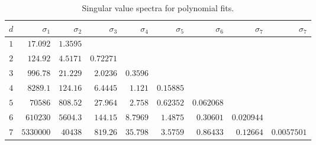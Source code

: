 {\small{
\begin{table}[t]
	\begin{center}
		\begin{tabular}{rrrrrrrrr}
 		  $d$ & $\sigma_{1}$ & $\sigma_{2}$ & $\sigma_{3}$ & $\sigma_{4}$ & 
		        $\sigma_{5}$ & $\sigma_{6}$ & $\sigma_{7}$ & $\sigma_{7}$ \\\hline
      $1$ & $17.092$ & $1.3595$ \\
      $2$ & $124.92$ & $4.5171$ & $0.72271$ \\
      $3$ & $996.78$ & $21.229$ & $2.0236$ & $0.3596$ \\
      $4$ & $8289.1$ & $124.16$ & $6.4445$ & $1.121$ & $0.15885$ \\
      $5$ & $70586$ & $808.52$ & $27.964$ & $2.758$ & $0.62352$ & $0.062068$ \\
      $6$ & $610230$ & $5604.3$ & $144.15$ & $8.7969$ & $1.4875$ & $0.30601$ & $0.020944$ \\
      $7$ & $5330000$ & $40438$ & $819.26$ & $35.798$ & $3.5759$ & $0.86433$ & $0.12664$ & $0.0057501$ \\
		\end{tabular}
	\end{center}
	\caption{Singular value spectra for polynomial fits.}
\end{table}%
}}
\endinput  %

